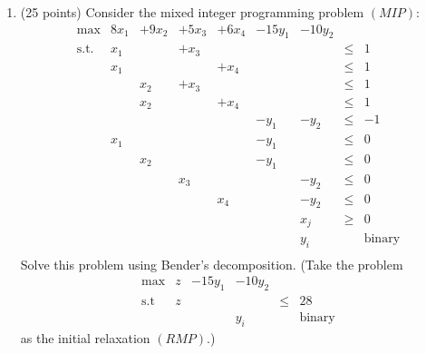 \begin{enumerate}
   \item (25 points)
Consider the mixed integer programming problem $(MIP)$:
     \begin{displaymath}
       \begin{array}{lrrrrrrcl}
         \max         & 8x_1 & +9x_2 & +5x_3 & +6x_4 & -15y_1 & -10y_2 \\
         \mbox{s.t. } & x_1 &&  +x_3 &&&& \leq & 1 \\
                      & x_1 &&& +x_4  &&& \leq & 1 \\
                      && x_2 &  +x_3 &&&& \leq & 1 \\
                      && x_2 && +x_4  &&& \leq & 1 \\
                      &&&&& -y_1 & -y_2 & \leq & -1 \\
                      &    x_1 &&&&  -y_1 && \leq & 0 \\
                      &&   x_2  &&&  -y_1 && \leq & 0 \\
                      &&&   x_3   &&& -y_2 & \leq & 0 \\
                      &&&&  x_4    && -y_2 & \leq & 0 \\
                      &&&&&& x_j & \geq & 0  \\
                      &&&&&& y_i && \mbox{binary} \\
       \end{array}
     \end{displaymath}
     Solve this problem using Bender's decomposition.
     (Take the problem
     \begin{displaymath}
       \begin{array}{lrrrcl}
         \max         & z & -15y_1 & -10y_2 \\
         \mbox{s.t}   & z &&& \leq & 28 \\
                      &&& y_i && \mbox{binary}
       \end{array}
     \end{displaymath}
     as the initial relaxation $(RMP)$.)
\end{enumerate}



